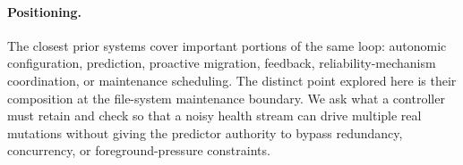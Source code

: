 \paragraph{Positioning.}
The closest prior systems cover important portions of the same loop: autonomic configuration, prediction, proactive migration, feedback, reliability-mechanism coordination, or maintenance scheduling. The distinct point explored here is their composition at the file-system maintenance boundary. We ask what a controller must retain and check so that a noisy health stream can drive multiple real mutations without giving the predictor authority to bypass redundancy, concurrency, or foreground-pressure constraints.
